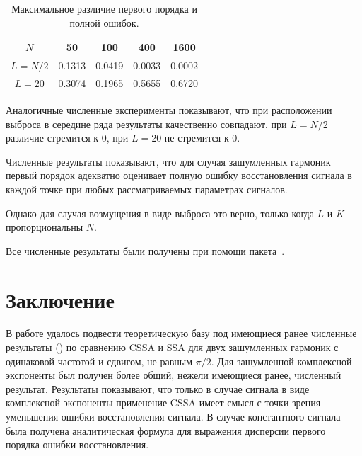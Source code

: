 \documentclass[12pt,a4paper]{article}
\begin{document}
\begin{table}[H]
	\begin{center}
		\caption{Максимальное различие первого порядка и полной ошибок.}
		\label{tab:const_outl}
		\begin{tabular}{|c|c|c|c|c|}
			\hline
			$N$	& 50 & 100 & 400 & 1600 \\
			\hline
			$L = N / 2$ & 0.1313  & 0.0419  & 0.0033 & 0.0002 \\
			\hline
			$L = 20$ & 0.3074  & 0.1965  & 0.5655 & 0.6720 \\
			\hline
		\end{tabular}
	\end{center}
\end{table}

Аналогичные численные эксперименты показывают, что при расположении выброса в середине ряда результаты качественно совпадают, при $L = N/2$ различие стремится к $0$, при $L = 20$ не стремится к $0$.

Численные результаты показывают, что для случая зашумленных гармоник первый порядок адекватно оценивает полную ошибку восстановления сигнала в каждой точке при любых рассматриваемых параметрах сигналов.

Однако для случая возмущения в виде выброса это верно, только когда $L$ и $K$ пропорциональны $N$.

Все численные результаты были получены при помощи пакета~\cite{Korobeynikov.etal2014}.


\section{Заключение}
\label{sec:conclusions}

В работе удалось подвести теоретическую базу под имеющиеся ранее численные результаты (\cite{Golyandina.etal2013}) по сравнению CSSA и SSA для двух зашумленных гармоник с одинаковой частотой и сдвигом, не равным $\pi/2$. Для зашумленной комплексной экспоненты был получен более общий, нежели имеющиеся ранее, численный результат.
Результаты показывают, что только в случае сигнала в виде комплексной экспоненты применение CSSA имеет смысл с точки зрения уменьшения ошибки восстановления сигнала. В случае константного сигнала была получена аналитическая формула для выражения дисперсии первого порядка ошибки восстановления.
\end{document}
